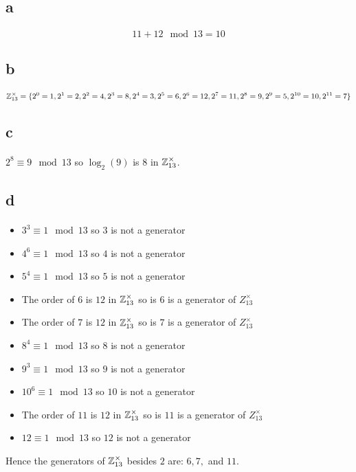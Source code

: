 \documentclass[letterpaper,12pt,oneside,onecolumn]{article}
\begin{document}
\section{}
\subsection{a}
\paragraph{}
$$11+12 \mod 13 = 10$$
\subsection{b}
\paragraph{}
$$\mathbb{Z}^\times_{13} = \{2^0=1, 2^1 = 2, 2^2 = 4, 2^3 = 8, 2^4 = 3, 2^5 = 6, 2^6=12, 2^7=11, 2^8 = 9, 2^9=5, 2^{10}=10, 2^{11} = 7\}$$
\subsection{c}
\paragraph{}
$2^8\equiv 9 \mod 13$ so $\log_2(9)$ is $8$ in $\mathbb{Z}^\times_{13}$.
\subsection{d}
\paragraph{}
\begin{itemize}
\item $3^3 \equiv 1 \mod 13$ so $3$ is not a generator
\item $4^6 \equiv 1 \mod 13$ so $4$ is not a generator
\item $5^4 \equiv 1 \mod 13$ so $5$ is not a generator
\item The order of $6$ is $12$ in $\mathbb{Z}_{13}^\times$ so is $6$ is a generator of $Z_{13}^\times$
\item The order of $7$ is $12$ in $\mathbb{Z}_{13}^\times$ so is $7$ is a generator of $Z_{13}^\times$
\item $8^4 \equiv 1 \mod 13$ so $8$ is not a generator
\item $9^3 \equiv 1 \mod 13$ so $9$ is not a generator
\item $10^6 \equiv 1 \mod 13$ so $10$ is not a generator
\item The order of $11$ is $12$ in $\mathbb{Z}_{13}^\times$ so is $11$ is a generator of $Z_{13}^\times$
\item $12 \equiv 1 \mod 13$ so $12$ is not a generator
\end{itemize}
Hence the generators of $\mathbb{Z}_{13}^\times$ besides $2$ are: $6,7,$ and $11$.
\newpage
\end{document}
